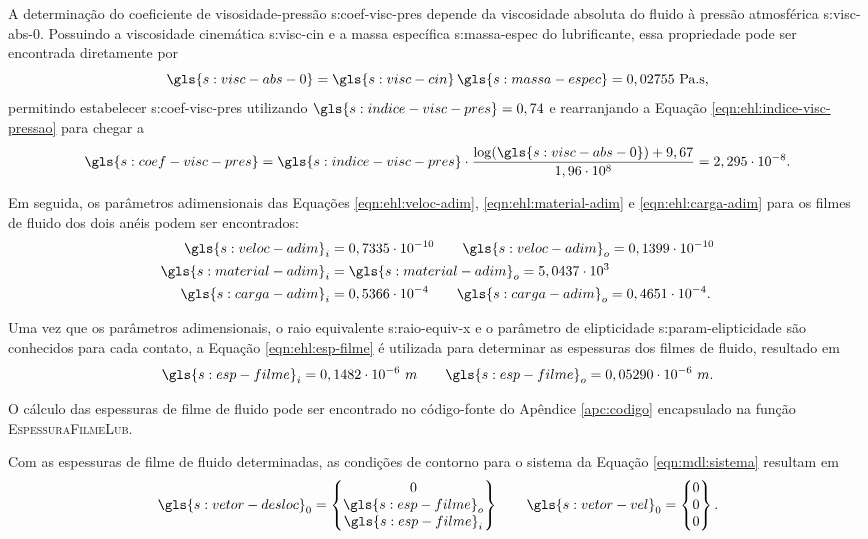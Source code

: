 \documentclass[12pt,oneside,english,brazil,lmodern,siglas,simbolos,cite=num]{ucsmonograph}
\begin{document}
	A determinação do coeficiente de visosidade-pressão \gls{s:coef-visc-pres} depende da viscosidade absoluta do fluido à pressão atmosférica \gls{s:visc-abs-0}.
	Possuindo a viscosidade cinemática \gls{s:visc-cin} e a massa específica \gls{s:massa-espec} do lubrificante, essa propriedade pode ser encontrada diretamente por \cite{roelands:1966}
	\begin{equation}
		\gls{s:visc-abs-0} = \gls{s:visc-cin}\,\gls{s:massa-espec} =
		0,02755\ \text{Pa.s},
	\end{equation}
	permitindo estabelecer \gls{s:coef-visc-pres} utilizando $\gls{s:indice-visc-pres} = 0,74$ e rearranjando a Equação \ref{eqn:ehl:indice-visc-pressao} para chegar a
	\begin{equation}
		\gls{s:coef-visc-pres} = \gls{s:indice-visc-pres}\cdot
		\frac{\log(\gls{s:visc-abs-0})+9,67}{1,96\cdot 10^8} =
		2,295\cdot 10^{-8}.
	\end{equation}
	
	Em seguida, os parâmetros adimensionais das Equações \ref{eqn:ehl:veloc-adim}, \ref{eqn:ehl:material-adim} e \ref{eqn:ehl:carga-adim} para os filmes de fluido dos dois anéis podem ser encontrados:
	\begin{align*}
		\gls{s:veloc-adim}_i &= 0,7335\cdot 10^{-10} \qquad
		\gls{s:veloc-adim}_o = 0,1399\cdot 10^{-10}\\
		\gls{s:material-adim}_i &= \gls{s:material-adim}_o =
		5,0437\cdot 10^3\\
		\gls{s:carga-adim}_i &= 0,5366\cdot 10^{-4} \qquad
		\gls{s:carga-adim}_o = 0,4651\cdot 10^{-4}.
	\end{align*}
	
	Uma vez que os parâmetros adimensionais, o raio equivalente \gls{s:raio-equiv-x} e o parâmetro de elipticidade \gls{s:param-elipticidade} são conhecidos para cada contato, a Equação \ref{eqn:ehl:esp-filme} é utilizada para determinar as espessuras dos filmes de fluido, resultado em
	\begin{equation*}
		\gls{s:esp-filme}_i = 0,1482\cdot 10^{-6}\ m \qquad
		\gls{s:esp-filme}_o = 0,05290\cdot 10^{-6}\ m.
	\end{equation*}
	
	O cálculo das espessuras de filme de fluido pode ser encontrado no código-fonte do Apêndice \ref{apc:codigo} encapsulado na função \textsc{EspessuraFilmeLub}.
	
	Com as espessuras de filme de fluido determinadas, as condições de contorno para o sistema da Equação \ref{eqn:mdl:sistema} resultam em
	\begin{equation*}
		\gls{s:vetor-desloc}_0 =
		\begin{Bmatrix}
		0 \\ \gls{s:esp-filme}_o \\ \gls{s:esp-filme}_i
		\end{Bmatrix} \qquad
		\gls{s:vetor-vel}_0 = 
		\begin{Bmatrix}
		0 \\ 0 \\ 0
		\end{Bmatrix}.
	\end{equation*}
	
\end{document}
